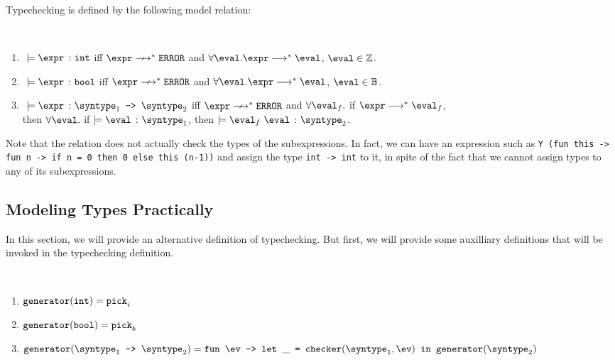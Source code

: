 Typechecking is defined by the following model relation:

\begin{definition}
  \label{def_typingM}
  \ \par
  \begin{enumerate}
      \item $\ \models \hastype{\expr}{\tint}$ iff $\expr \nsmallsteps[] \eerror$ and $\forall \eval. \expr \smallsteps[] \eval$, $\eval \in \mathbb{Z}$.
      \item $\ \models \hastype{\expr}{\tbool}$ iff $\expr \nsmallsteps[] \eerror$ and $\forall \eval.\expr \smallsteps[] \eval$, $\eval \in \mathbb{B}$.
      \item $\ \models \hastype{\expr}{\mkfun{\syntype_1}{\syntype_2}}$ iff $\expr \nsmallsteps[] \eerror$ and $\forall \eval_f.$ if $\expr \smallsteps[] \eval_f$, \\ then $\forall{\eval}.$ if $\models \hastype{\eval}{\syntype_1}$, then $\models \hastype{\eval_f\ \eval}{\syntype_2}$.
   \end{enumerate}
\end{definition}

Note that the relation does not actually check the types of the subexpressions. In 
fact, we can have an expression such as \texttt{Y}\ 
\texttt{(fun this -> fun n -> if n = 0 then 0 else this (n-1))} and 
assign the type \texttt{int -> int} to it, in spite of the fact that
we cannot assign types to any of its subexpressions.

\subsection{Modeling Types Practically}

In this section, we will provide an alternative definition of typechecking. But first, we will provide some auxilliary definitions that will be invoked in the typechecking definition.

\begin{definition}
  \label{def_genCore}
  \ \par 
  \begin{enumerate}
    \item $\texttt{generator}(\texttt{int}) = \texttt{pick}_i$
    \item $\texttt{generator}(\texttt{bool}) = \texttt{pick}_b$
    \item $\mkgen{\mkfun{\syntype_1}{\syntype_2}} = \mkfunv{\ev}{\letin{\_}{\mkche{\syntype_1}{\ev}}{\mkgen{\syntype_2}}}$
  \end{enumerate}
\end{definition}

